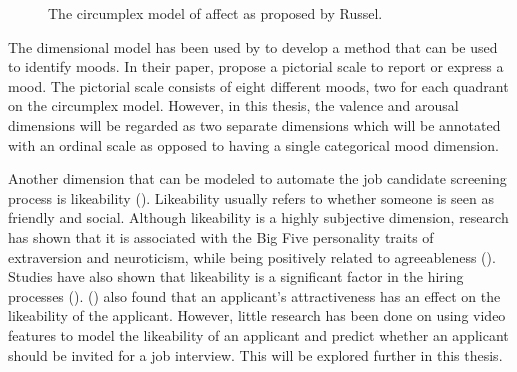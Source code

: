 \begin{figure}[h]
  \centering
  
  \caption{The circumplex model of affect as proposed by Russel.}
  \label{fig:circumplexrussel}
\end{figure}

The dimensional model has been used by \textcite{desmet2016mood} to develop a method that can be used to identify moods. In their paper, \citeauthor{desmet2016mood} propose a pictorial scale to report or express a mood. The pictorial scale consists of eight different moods, two for each quadrant on the circumplex model. However, in this thesis, the valence and arousal dimensions will be regarded as two separate dimensions which will be annotated with an ordinal scale as opposed to having a single categorical mood dimension.

Another dimension that can be modeled to automate the job candidate screening process is likeability (\cite{celiktutan2015automatic}). Likeability usually refers to whether someone is seen as friendly and social. Although likeability is a highly subjective dimension, research has shown that it is associated with the Big Five personality traits of extraversion and neuroticism, while being positively related to agreeableness (\cite{van2010classroom}). Studies have also shown that likeability is a significant factor in the hiring processes (\cite{raza1987model}). \citeauthor{hayes1997comparison} (\citeyear{hayes1997comparison}) also found that an applicant's attractiveness has an effect on the likeability of the applicant. However, little research has been done on using video features to model the likeability of an applicant and predict whether an applicant should be invited for a job interview. This will be explored further in this thesis. 

